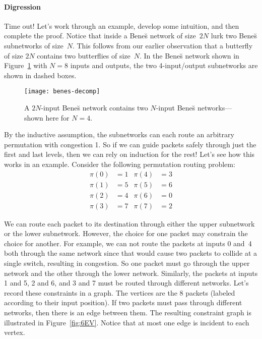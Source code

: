 \paragraph{Digression}

Time out!  Let's work through an example, develop some intuition, and
then complete the proof.  Notice that inside a Bene\u{s} network of
size~$2N$ lurk two Bene\u{s} subnetworks of size~$N$.  This follows
from our earlier observation that a butterfly of size $2N$ contains
two butterflies of size~$N$.  In the Bene\u{s} network shown in
Figure~\ref{fig:6EU} with $N=8$ inputs and outputs, the two
4-input/output subnetworks are shown in dashed boxes.

\begin{figure}

\texttt{[image: benes-decomp]}

\caption{A $2N$-input Bene\u{s} network contains two $N$-input
  Bene\u{s} networks---shown here for $N = 4$.}

\label{fig:6EU}

\end{figure}

By the inductive assumption, the subnetworks can each route an
arbitrary permutation with congestion 1.  So if we can guide packets
safely through just the first and last levels, then we can rely on
induction for the rest!  Let's see how this works in an example.
Consider the following permutation routing problem:
%
\begin{align*}
\pi(0) & = 1 & \pi(4) & = 3 \\
\pi(1) & = 5 & \pi(5) & = 6 \\
\pi(2) & = 4 & \pi(6) & = 0 \\
\pi(3) & = 7 & \pi(7) & = 2
\end{align*}

We can route each packet to its destination through either the upper
subnetwork or the lower subnetwork.  However, the choice for one
packet may constrain the choice for another.  For example, we can not
route the packets at inputs 0 and~4 both through the same network
since that would cause two packets to collide at a single switch,
resulting in congestion.  So one packet must go through the upper
network and the other through the lower network.  Similarly, the
packets at inputs 1 and 5, 2 and 6, and 3 and 7 must be routed through
different networks.  Let's record these constraints in a graph.  The
vertices are the 8 packets (labeled according to their input
position).  If two packets must pass through different networks, then
there is an edge between them.  The resulting constraint graph is
illustrated in Figure~\ref{fig:6EV}.  Notice that at most one edge is
incident to each vertex.

